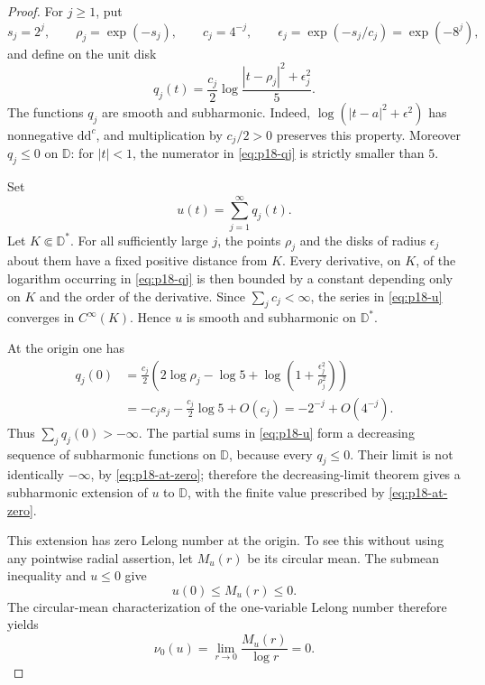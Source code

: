 \begin{proof}
For \(j\geq1\), put
\[
 s_j=2^j,\qquad
 \rho_j=\exp(-s_j),\qquad
 c_j=4^{-j},\qquad
 \epsilon_j=\exp(-s_j/c_j)=\exp(-8^j),
\]
and define on the unit disk
\[
 q_j(t)=\frac{c_j}{2}
   \log\frac{|t-\rho_j|^2+\epsilon_j^2}{5}.
\tag{66.20d}\label{eq:p18-qj}
\]
The functions \(q_j\) are smooth and subharmonic.  Indeed,
\(\log(|t-a|^2+\epsilon^2)\) has nonnegative
\(\mathrm d\mathrm d^c\), and multiplication by \(c_j/2>0\)
preserves this property.  Moreover \(q_j\leq0\) on \(\mathbb D\):
for \(|t|<1\), the numerator in \eqref{eq:p18-qj} is strictly smaller
than \(5\).

Set
\[
                         u(t)=\sum_{j=1}^{\infty}q_j(t).
\tag{66.20e}\label{eq:p18-u}
\]
Let \(K\Subset\mathbb D^*\).  For all sufficiently large \(j\), the
points \(\rho_j\) and the disks of radius \(\epsilon_j\) about them
have a fixed positive distance from \(K\).  Every derivative, on \(K\),
of the logarithm occurring in \eqref{eq:p18-qj} is then bounded by a
constant depending only on \(K\) and the order of the derivative.
Since \(\sum_jc_j<\infty\), the series in \eqref{eq:p18-u} converges in
\(C^\infty(K)\).  Hence \(u\) is smooth and subharmonic on
\(\mathbb D^*\).

At the origin one has
\[
\begin{aligned}
 q_j(0)
 &=
 \frac{c_j}{2}
 \left(
  2\log\rho_j-\log5+
  \log\left(1+\frac{\epsilon_j^2}{\rho_j^2}\right)
 \right)\\
 &=-c_js_j-\frac{c_j}{2}\log5+O(c_j)
  =-2^{-j}+O(4^{-j}).
\end{aligned}
\tag{66.20f}\label{eq:p18-at-zero}
\]
Thus \(\sum_jq_j(0)>-\infty\).  The partial sums in
\eqref{eq:p18-u} form a decreasing sequence of subharmonic functions on
\(\mathbb D\), because every \(q_j\leq0\).  Their limit is not
identically \(-\infty\), by \eqref{eq:p18-at-zero}; therefore the
decreasing-limit theorem gives a subharmonic extension of \(u\) to
\(\mathbb D\), with the finite value prescribed by
\eqref{eq:p18-at-zero}.

This extension has zero Lelong number at the origin.  To see this without
using any pointwise radial assertion, let \(M_u(r)\) be its circular
mean.  The submean inequality and \(u\leq0\) give
\[
                         u(0)\leq M_u(r)\leq0.
\]
The circular-mean characterization of the one-variable Lelong number
therefore yields
\[
                       \nu_0(u)
                       =\lim_{r\to0}\frac{M_u(r)}{\log r}=0.
\tag{66.20g}\label{eq:p18-zero-lelong}
\]


\end{proof}
